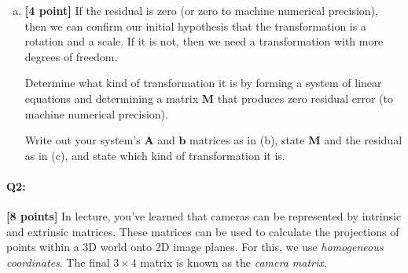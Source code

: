 \begin{enumerate}[(a)]
\pagebreak
\item \textbf{[4 point]} If the residual is zero (or zero to machine numerical precision), then we can confirm our initial hypothesis that the transformation is a rotation and a scale. If it is not, then we need a transformation with more degrees of freedom.

\begin{tcolorbox}[colback=orange!5!white,colframe=orange!75!black]
    Determine what kind of transformation it is by forming a system of linear equations and determining a matrix $\bm{M}$ that produces zero residual error (to machine numerical precision). 
    
    Write out your system's $\bm{A}$ and $\bm{b}$ matrices as in (b), state $\bm{M}$ and the residual as in (c), and state which kind of transformation it is.
\end{tcolorbox}


\end{enumerate}



\pagebreak
\paragraph{Q2:} \textbf{[8 points]}
In lecture, you've learned that cameras can be represented by intrinsic and extrinsic matrices. These matrices can be used to calculate the projections of points within a 3D world onto 2D image planes. For this, we use \emph{homogeneous coordinates}. The final $3\times4$ matrix is known as the \emph{camera matrix}.

